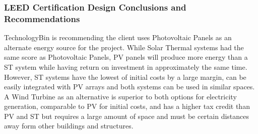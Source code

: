 \documentclass{ceri}
\begin{document}
\begin{table}[H]
\centering
\caption{LEED Certification Design Decision Matrix}
\label{table:LEEDMatrix}
\end{table}
\newpage
\subsubsection{LEED Certification Design Conclusions and Recommendations}
TechnologyBin is recommending the client uses Photovoltaic Panels as an alternate energy source for the project. While Solar Thermal systems had the same score as Photovoltaic Panels, PV panels will produce more energy than a ST system while having return on investment in approximately the same time. However, ST systems have the lowest of initial costs by a large margin, can be easily integrated with PV arrays and both systems can be used in similar spaces. A Wind Turbine as an alternative is superior to both options for electricity generation, comparable to PV for initial costs, and has a higher tax credit than PV and ST but requires a large amount of space and must be certain distances away form other buildings and structures.
\end{document}
